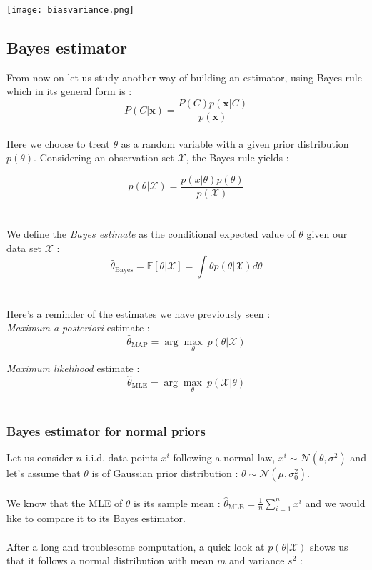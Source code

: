 \documentclass[a4paper,12pt]{article}
\newcommand{\xx}{{\bm x}}
\begin{document}
\begin{center}
\texttt{[image: biasvariance.png]}
\end{center}

\subsection{Bayes estimator}
From now on let us study another way of building an estimator, using Bayes rule which in its general form is :
\[P(C|\xx)  = \dfrac{P(C)p(\xx|C)}{p(\xx)}\]\\
Here we choose to treat $\theta$ as a random variable with a given prior distribution $p(\theta)$. Considering an observation-set $\mathcal{X}$, the Bayes rule yields :

\[p(\theta|\mathcal{X})=\frac{p(x|\theta)p(\theta)}{p(\mathcal{X})}\]\\
\\
We define the {\em Bayes estimate} as the conditional expected value of $\theta$ given our data set $\mathcal{X}$ :
\[\hat{\theta}_{\mbox{Bayes}}=\mathbb{E}[\theta|\mathcal{X}]=\int{\!\theta p(\theta|\mathcal{X})d\theta}\]\\
\\
Here's a reminder of the estimates we have previously seen :\\

{\em Maximum a posteriori} estimate :
\[\hat{\theta}_{\mbox{MAP}}=\arg\underset{\theta}\max \  p(\theta|\mathcal{X})\]

{\em Maximum likelihood} estimate :
\[\hat{\theta}_{\mbox{MLE}}=\arg\underset{\theta}\max \  p(\mathcal{X}|\theta)\]\\


\subsubsection{Bayes estimator for normal priors}

Let us consider $n$ i.i.d. data points $x^i$ following a normal law, $x^i\sim\mathcal{N}(\theta,\sigma^2)$ and let's assume that $\theta$ is of Gaussian prior distribution : $\theta\sim\mathcal{N}(\mu,\sigma_0^2)$.\\
\\
We know that the MLE of $\theta$ is its sample mean : $\hat{\theta}_{\mbox{MLE}} = \frac{1}{n} \sum_{i=1}^nx^i$ and we would like to compare it to its Bayes estimator.\\
\\
After a long and troublesome computation, a quick look at $p(\theta|\mathcal{X})$ shows us that it follows a normal distribution with mean $m$ and variance $s^2$ :
\end{document}
